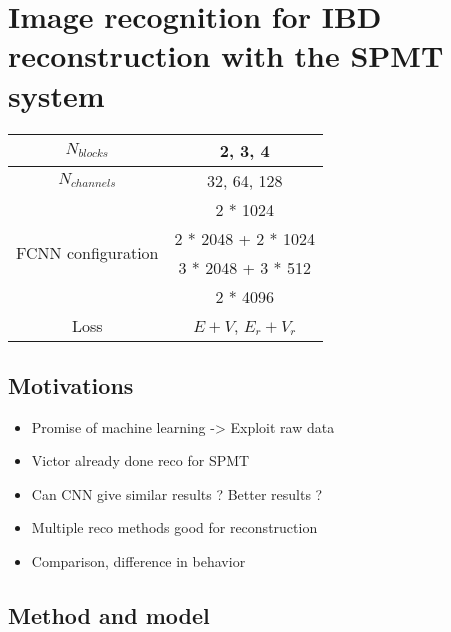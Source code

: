 \chapter{Image recognition for IBD reconstruction with the SPMT system}
\label{sec:jcnn}
\begin{table}[ht]
  \centering
  \begin{tabular}{ | c | c | }
    \hline $N_{blocks}$ & {2, 3, 4} \\
    \hline $N_{channels}$ & {32, 64, 128} \\
    \hline
    \multirow{4}{*}{FCNN configuration} & 2 * 1024 \\
                                        & 2 * 2048 + 2 * 1024 \\
                                        & 3 * 2048 + 3 * 512 \\
                                        & 2 * 4096 \\
    \hline
    Loss & $E+V$, $E_r + V_r$ \\
    \hline

  \end{tabular}
\end{table}

\section{Motivations}

\begin{itemize}
  \item Promise of machine learning -> Exploit raw data
  \item Victor already done reco for SPMT
  \item Can CNN give similar results ? Better results ?
  \item Multiple reco methods good for reconstruction
  \item Comparison, difference in behavior
\end{itemize}

\section{Method and model}


